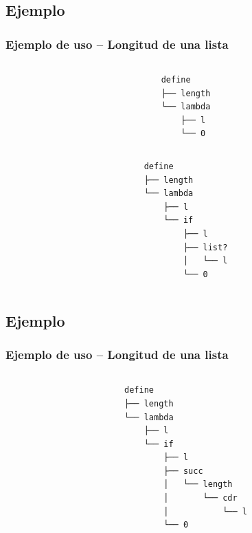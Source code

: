 \documentclass[xcolor=x11names,compress]{beamer}
\renewcommand{\(}{\begin{columns}}
\renewcommand{\)}{\end{columns}}
\newcommand{\<}[1]{\begin{column}{#1}}
\renewcommand{\>}{\end{column}}
\begin{document}
\subsection{Ejemplo}
\begin{frame}[fragile]
    \frametitle{Ejemplo de uso -- Longitud de una lista}
    \begin{columns}
        \begin{column}{.50\linewidth}
        \begin{block}
            \codeLengthExampleA
        \end{block}
        \end{column}\pause
        \begin{column}{.50\linewidth}
        \begin{verbatim}
define
├── length
└── lambda
    ├── l
    └── 0
        \end{verbatim}
        \end{column}
    \end{columns}\pause

    \begin{columns}
        \begin{column}{.50\linewidth}
        \begin{block}
            \codeLengthExampleB
        \end{block}
        \end{column}\pause
        \begin{column}{.50\linewidth}
        \begin{verbatim}
define
├── length
└── lambda
    ├── l
    └── if
        ├── l
        ├── list?
        │   └── l
        └── 0
        \end{verbatim}
        \end{column}
    \end{columns}
\end{frame}


\subsection{Ejemplo}
\begin{frame}[fragile]
    \frametitle{Ejemplo de uso -- Longitud de una lista}
    \begin{columns}
        \begin{column}{.50\linewidth}
        \begin{block}
            \codeLengthExampleC
        \end{block}
        \end{column}\pause
        \begin{column}{.50\linewidth}
        \begin{verbatim}
define
├── length
└── lambda
    ├── l
    └── if
        ├── l
        ├── succ
        │   └── length
        │       └── cdr
        │           └── l
        └── 0
        \end{verbatim}
        \end{column}
    \end{columns}
\end{frame}
\end{document}
